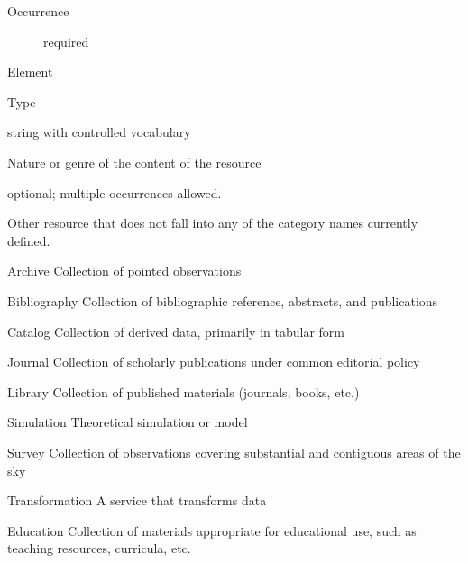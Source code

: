 \documentclass[11pt,a4paper]{ivoa}
\begin{document}
\begin{bigdescription}
\begin{description}
\item[Occurrence] required

\end{description}
\item[Element \xmlel{type}]
\begin{description}
Type
\item[Type] string with controlled vocabulary
\item[Meaning] 
               Nature or genre of the content of the resource
             
\item[Occurrence] optional; multiple occurrences allowed.

\item[Allowed Values]\hfil
\begin{longtermsdescription}
\item[Other]
               resource that does not fall into any of the category names
               currently defined.
             
\item[Archive]
               Collection of pointed observations
             
\item[Bibliography]
               Collection of bibliographic reference, abstracts, and 
               publications
             
\item[Catalog]
               Collection of derived data, primarily in tabular form
             
\item[Journal]
               Collection of scholarly publications under common editorial 
               policy
             
\item[Library]
               Collection of published materials (journals, books, etc.)
             
\item[Simulation]
               Theoretical simulation or model
             
\item[Survey]
               Collection of observations covering substantial and
               contiguous areas of the sky
             
\item[Transformation]
               A service that transforms data
             
\item[Education]
               Collection of materials appropriate for educational use, such
               as teaching resources, curricula, etc.
             

\end{longtermsdescription}
\end{description}
\end{bigdescription}
\end{document}
